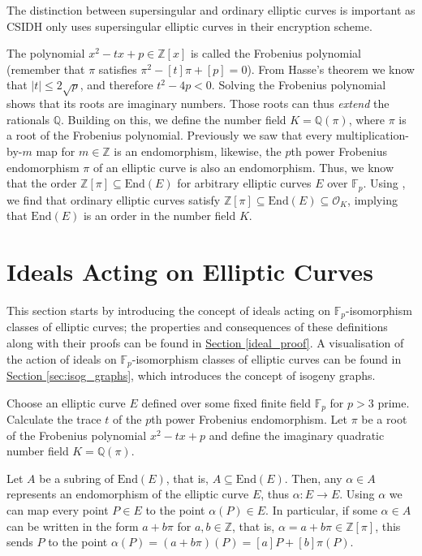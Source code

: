 \documentclass[openany, a4paper, 10pt]{book}
\theoremstyle{plain}
\theoremstyle{plain}
\theoremstyle{plain}
\theoremstyle{definition}
\theoremstyle{plain}
\theoremstyle{definition}
\theoremstyle{remark}
\newcommand{\secref}[1]{\hyperref[#1]{Section \ref{#1}}}
\begin{document}
The distinction between supersingular and ordinary elliptic curves is important as CSIDH only uses supersingular elliptic curves in their encryption scheme.

The polynomial $x^2-tx+p \in \mathbb Z[x]$ is called the Frobenius polynomial (remember that $\pi$ satisfies $\pi^2 - [t]\pi + [p] = 0$).
From Hasse's theorem \cite{Hasse} we know that $|t| \leq 2\sqrt{p}$, and therefore $t^2-4p<0$.
Solving the Frobenius polynomial shows that its roots are imaginary numbers.
Those roots can thus \textit{extend} the rationals $\mathbb Q$.
Building on this, we define the number field $K = \mathbb Q(\pi)$, where $\pi$ is a root of the Frobenius polynomial.
Previously we saw that every multiplication-by-$m$ map for $m \in \mathbb Z$ is an endomorphism, likewise, the $p$th power Frobenius endomorphism $\pi$ of an elliptic curve is also an endomorphism.
Thus, we know that the order $\mathbb Z[\pi] \subseteq \mathrm{End}(E)$ for arbitrary elliptic curves $E$ over $\mathbb F_p$.
Using \cite[Theorems~13.6-13.8]{supersingular_curves}, we find that ordinary elliptic curves satisfy $\mathbb Z[\pi]\subseteq \mathrm{End}(E)\subseteq\mathcal O_K$, implying that $\mathrm{End}(E)$ is an order in the number field $K$.

\section{Ideals Acting on Elliptic Curves}\label{ideals_acting}
This section starts by introducing the concept of ideals acting on $\mathbb F_p$-isomorphism classes of elliptic curves; the properties and consequences of these definitions along with their proofs can be found in \secref{ideal_proof}.
A visualisation of the action of ideals on $\mathbb F_p$-isomorphism classes of elliptic curves can be found in \secref{sec:isog_graphs}, which introduces the concept of isogeny graphs.

Choose an elliptic curve $E$ defined over some fixed finite field $\mathbb F_p$ for $p>3$ prime.
Calculate the trace $t$ of the $p$th power Frobenius endomorphism.
Let $\pi$ be a root of the Frobenius polynomial $x^2-tx+p$ and define the imaginary quadratic number field $K = \mathbb Q(\pi)$.

Let $A$ be a subring of $\mathrm{End}(E)$, that is, $A \subseteq \mathrm{End}(E)$.
Then, any $\alpha \in A$ represents an endomorphism of the elliptic curve $E$, thus $\alpha: E \to E$.
Using $\alpha$ we can map every point $P \in E$ to the point $\alpha(P) \in E$.
In particular, if some $\alpha \in A$ can be written in the form $a+b\pi$ for $a,b \in \mathbb Z$, that is, $\alpha=a+b\pi \in \mathbb Z[\pi]$, this sends $P$ to the point $\alpha(P)=(a+b\pi)(P) = [a]P + [b]\pi(P)$.
\end{document}

